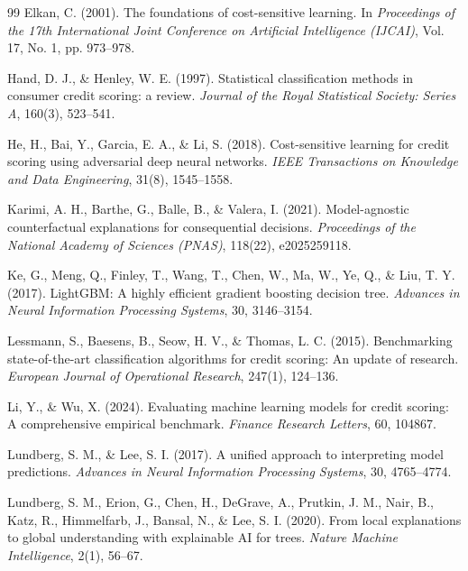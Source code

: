 \documentclass[11pt,a4paper]{article}
\begin{document}
\begin{thebibliography}{99}
Elkan, C. (2001). The foundations of cost-sensitive learning. In \textit{Proceedings of the 17th International Joint Conference on Artificial Intelligence (IJCAI)}, Vol. 17, No. 1, pp. 973--978.

Hand, D. J., \& Henley, W. E. (1997). Statistical classification methods in consumer credit scoring: a review. \textit{Journal of the Royal Statistical Society: Series A}, 160(3), 523--541.

He, H., Bai, Y., Garcia, E. A., \& Li, S. (2018). Cost-sensitive learning for credit scoring using adversarial deep neural networks. \textit{IEEE Transactions on Knowledge and Data Engineering}, 31(8), 1545--1558.

Karimi, A. H., Barthe, G., Balle, B., \& Valera, I. (2021). Model-agnostic counterfactual explanations for consequential decisions. \textit{Proceedings of the National Academy of Sciences (PNAS)}, 118(22), e2025259118.

Ke, G., Meng, Q., Finley, T., Wang, T., Chen, W., Ma, W., Ye, Q., \& Liu, T. Y. (2017). LightGBM: A highly efficient gradient boosting decision tree. \textit{Advances in Neural Information Processing Systems}, 30, 3146--3154.

Lessmann, S., Baesens, B., Seow, H. V., \& Thomas, L. C. (2015). Benchmarking state-of-the-art classification algorithms for credit scoring: An update of research. \textit{European Journal of Operational Research}, 247(1), 124--136.

Li, Y., \& Wu, X. (2024). Evaluating machine learning models for credit scoring: A comprehensive empirical benchmark. \textit{Finance Research Letters}, 60, 104867.

Lundberg, S. M., \& Lee, S. I. (2017). A unified approach to interpreting model predictions. \textit{Advances in Neural Information Processing Systems}, 30, 4765--4774.

Lundberg, S. M., Erion, G., Chen, H., DeGrave, A., Prutkin, J. M., Nair, B., Katz, R., Himmelfarb, J., Bansal, N., \& Lee, S. I. (2020). From local explanations to global understanding with explainable AI for trees. \textit{Nature Machine Intelligence}, 2(1), 56--67.


\end{thebibliography}
\end{document}
